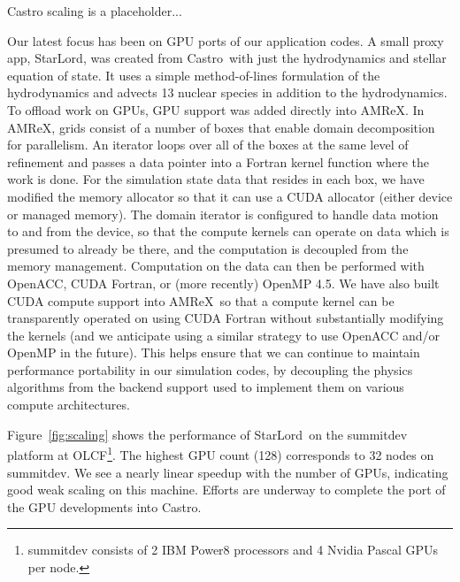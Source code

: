 \documentclass[letterpaper]{jpconf}
\newcommand{\castro}{{\sffamily Castro}}
\newcommand{\starlord}{{\sffamily StarLord}}
\newcommand{\amrex}{{\sffamily AMReX}}
\newcommand{\MarginPar}[1]{\marginpar{\vskip-\baselineskip\raggedright\tiny\sffamily\hrule\smallskip{\color{red}#1}\par\smallskip\hrule}}
\begin{document}
Castro scaling is a placeholder...

Our latest focus has been on GPU ports of our application codes.  A
small proxy app, \starlord, was created from \castro\ with just the
hydrodynamics and stellar equation of state.  It uses a simple
method-of-lines formulation of the hydrodynamics and advects 13
nuclear species in addition to the hydrodynamics.  To offload work on
GPUs, GPU support was added directly into \amrex.  In \amrex, grids
consist of a number of boxes that enable domain decomposition for
parallelism.  An iterator loops over all of the boxes at the same
level of refinement and passes a data pointer into a Fortran kernel
function where the work is done. For the simulation state data that
resides in each box, we have modified the memory allocator so that it
can use a CUDA allocator (either device or managed memory).  The
domain iterator is configured to handle data motion to and from the
device, so that the compute kernels can operate on data which is
presumed to already be there, and the computation is decoupled from
the memory management. Computation on the data can then be performed
with OpenACC, CUDA Fortran, or (more recently) OpenMP 4.5. We have
also built CUDA compute support into \amrex\ so that a compute kernel
can be transparently operated on using CUDA Fortran without
substantially modifying the kernels (and we anticipate using a similar
strategy to use OpenACC and/or OpenMP in the future). This helps
ensure that we can continue to maintain performance portability in our
simulation codes, by decoupling the physics algorithms from the
backend support used to implement them on various compute
architectures.\MarginPar{add CPU time for reference}

Figure~\ref{fig:scaling} shows the performance of \starlord\ on the
summitdev platform at OLCF\footnote{summitdev consists of 2 IBM Power8
  processors and 4 Nvidia Pascal GPUs per node.}.  The highest GPU
count (128) corresponds to 32 nodes on summitdev.  We see a nearly
linear speedup with the number of GPUs, indicating good weak scaling
on this machine.  Efforts are underway to complete the port of the GPU
developments into \castro.
\end{document}
